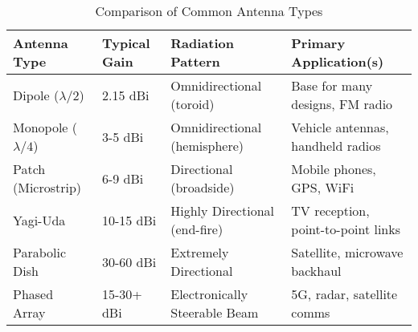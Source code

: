 \begin{table}[H]
    \centering
    \caption{Comparison of Common Antenna Types}
    \label{tab:antenna-types}
    \begin{tabular}{@{}llll@{}}
        \toprule
        \tableheaderfont Antenna Type & \tableheaderfont Typical Gain & \tableheaderfont Radiation Pattern & \tableheaderfont Primary Application(s) \\
        \midrule
        Dipole ($\lambda/2$) & 2.15 dBi & Omnidirectional (toroid) & Base for many designs, FM radio \\
        Monopole ($\lambda/4$) & 3-5 dBi & Omnidirectional (hemisphere) & Vehicle antennas, handheld radios \\
        Patch (Microstrip) & 6-9 dBi & Directional (broadside) & Mobile phones, GPS, WiFi \\
        Yagi-Uda & 10-15 dBi & Highly Directional (end-fire) & TV reception, point-to-point links \\
        Parabolic Dish & 30-60 dBi & Extremely Directional & Satellite, microwave backhaul \\
        Phased Array & 15-30+ dBi & Electronically Steerable Beam & 5G, radar, satellite comms \\
        \bottomrule
    \end{tabular}
\end{table}


